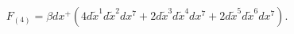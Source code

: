 \begin{equation}
\label{fluxn3pp}
F_{(4)} = \beta dx^+ \left(
4 d\tilde{x}^1 d\tilde{x}^2 dx^7
+ 2 d\tilde{x}^3 d\tilde{x}^4 dx^7
+ 2 d\tilde{x}^5 d\tilde{x}^6 dx^7 \right).
\end{equation}

